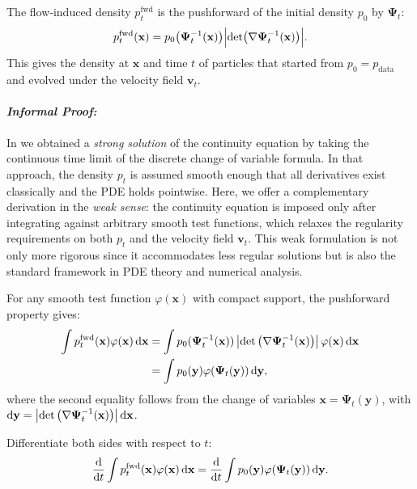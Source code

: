 The flow‑induced density $p_t^{\mathrm{fwd}}$ is the pushforward of the initial density $p_0$ by $\bm{\Psi}_t$:
\[
p_t^{\mathrm{fwd}}(\mathbf{x})
= p_0\bigl(\bm{\Psi}_t^{-1}(\mathbf{x})\bigr)
  \Bigl|\det \bigl(\nabla\bm{\Psi}_t^{-1}(\mathbf{x})\bigr)\Bigr|.
\]
This gives the density at $\mathbf{x}$ and time $t$ of particles that started from $p_0=p_{\mathrm{data}}$ and evolved under the velocity field $\mathbf{v}_t$.


\paragraph{\textit{Informal Proof:}} 
In  we obtained a \emph{strong solution} of the continuity equation by taking the continuous time limit of the discrete change of variable formula. In that approach, the density $p_t$ is assumed smooth enough that all derivatives exist classically and the PDE holds pointwise. Here, we offer a complementary derivation in the \emph{weak sense}: the continuity equation is imposed only after integrating against arbitrary smooth test functions, which relaxes the regularity requirements on both $p_t$ and the velocity field $\mathbf{v}_t$. This weak formulation is not only more rigorous since it accommodates less regular solutions but is also the standard framework in PDE theory and numerical analysis.


For any smooth test function $ \varphi(\mathbf{x}) $ with compact support, the pushforward property gives:
\begin{align*}
    \int p_t^{\mathrm{fwd}}(\mathbf{x}) \varphi(\mathbf{x})  \mathop{}\!\mathrm{d}\mathbf{x} &= \int p_0(\bm{\Psi}_t^{-1}(\mathbf{x})) \left| \det\left( \nabla \bm{\Psi}_t^{-1}(\mathbf{x}) \right) \right| \varphi(\mathbf{x}) \mathop{}\!\mathrm{d}\mathbf{x}\\ &=  \int p_0(\mathbf{y}) \varphi(\bm{\Psi}_t(\mathbf{y})) \mathop{}\!\mathrm{d}\mathbf{y},
\end{align*}
where the second equality follows from the change of variables $ \mathbf{x} = \bm{\Psi}_t(\mathbf{y}) $, with $ \mathop{}\!\mathrm{d}\mathbf{y} = \left| \det\left( \nabla \bm{\Psi}_t^{-1}(\mathbf{x}) \right) \right| \mathop{}\!\mathrm{d}\mathbf{x} $.


Differentiate both sides with respect to $ t $:
\[
\frac{\mathop{}\!\mathrm{d}}{\mathop{}\!\mathrm{d} t} \int p_t^{\mathrm{fwd}}(\mathbf{x}) \varphi(\mathbf{x}) \mathop{}\!\mathrm{d}\mathbf{x} = \frac{\mathop{}\!\mathrm{d}}{\mathop{}\!\mathrm{d} t} \int p_0(\mathbf{y}) \varphi(\bm{\Psi}_t(\mathbf{y})) \mathop{}\!\mathrm{d}\mathbf{y}.
\]

